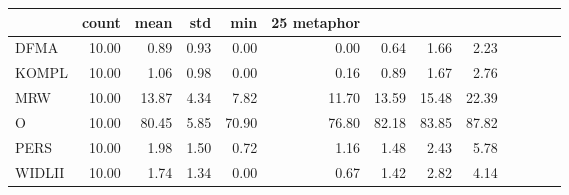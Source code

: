 \begin{tabular}{lrrrrrrrr}
\toprule
 & count & mean & std & min & 25%
metaphor &  &  &  &  &  &  &  &  \\
\midrule
DFMA & 10.00 & 0.89 & 0.93 & 0.00 & 0.00 & 0.64 & 1.66 & 2.23 \\
KOMPL & 10.00 & 1.06 & 0.98 & 0.00 & 0.16 & 0.89 & 1.67 & 2.76 \\
MRW & 10.00 & 13.87 & 4.34 & 7.82 & 11.70 & 13.59 & 15.48 & 22.39 \\
O & 10.00 & 80.45 & 5.85 & 70.90 & 76.80 & 82.18 & 83.85 & 87.82 \\
PERS & 10.00 & 1.98 & 1.50 & 0.72 & 1.16 & 1.48 & 2.43 & 5.78 \\
WIDLII & 10.00 & 1.74 & 1.34 & 0.00 & 0.67 & 1.42 & 2.82 & 4.14 \\
\bottomrule
\end{tabular}
